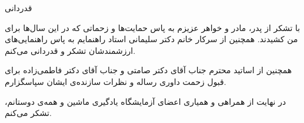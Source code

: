 \thispagestyle{empty}

{\nastaliq
 قدردانی

با تشکر از پدر، مادر و خواهر عزیزم به پاس حمایت‌ها و زحماتی که در این سال‌ها برای من کشیدند.   همچنین از سرکار خانم دکتر سلیمانی استاد راهنمایم به پاس راهنمایی‌های ارزشمندشان تشکر و قدردانی می‌کنم. 

همچنین از اساتید محترم جناب آقای دکتر صامتی و جناب آقای دکتر فاطمی‌زاده برای قبول زحمت داوری رساله و نظرات سازنده‌ی ایشان سپاسگزارم.

در نهایت از همراهی و همیاری اعضای آزمایشگاه یادگیری ماشین و همه‌ی دوستانم، تشکر می‌کنم. 
}\\[2cm]
\newpage\clearpage